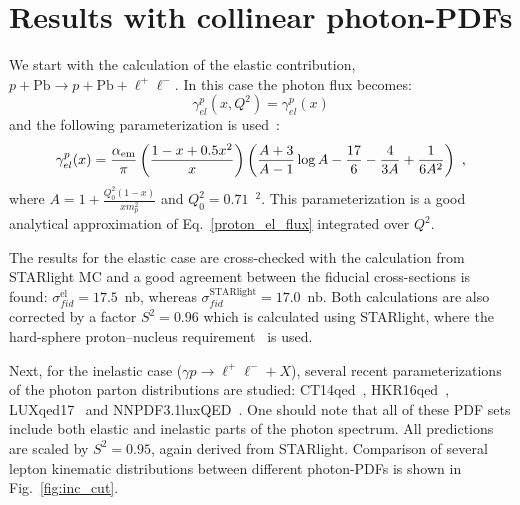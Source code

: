 \section{Results with collinear photon-PDFs}

We start with the calculation of the elastic contribution, $p+\textrm{Pb}\rightarrow p+\textrm{Pb}+ \ell^+\ell^-$.
In this case the photon flux becomes:
\begin{equation}
\gamma^{p}_{el}(x, Q^2) = \gamma^{p}_{el}(x) 
\end{equation}
and the following parameterization is used~\cite{Budnev:1974de}:
\begin{equation}
\gamma^{p}_{el}(x)  = \frac{\alpha_{\rm em}}{\pi}
\left(
\frac{1-x+0.5x^2}{x}
\right)
\left(
\frac{A+3}{A-1}\log{A}-\frac{17}{6}-\frac{4}{3A}+\frac{1}{6A^2}
\right)~,
\end{equation}
where $A = 1+\frac{Q_0^2(1-x)}{x m_p^2}$ and $Q_0^2 = 0.71$~\GeV$^2$. This parameterization is a good analytical approximation of Eq.~\ref{proton_el_flux} integrated over $Q^2$.

The results for the elastic case are cross-checked with the calculation from STARlight MC and a good agreement between the fiducial cross-sections is found:
$\sigma_{fid}^{\textrm{el}} = 17.5$~nb, whereas $\sigma_{fid}^{\textrm{STARlight}} = 17.0$~nb.
Both calculations are also corrected by a factor $S^2=0.96$ which 
is calculated using STARlight, where the hard-sphere proton--nucleus requirement~\cite{Klein:2016yzr} is used.

Next, for the inelastic case ($\gamma p\rightarrow \ell^+\ell^- + X$), several recent parameterizations of the photon parton distributions are studied: CT14qed~\cite{Schmidt:2015zda}, HKR16qed~\cite{Harland-Lang:2016kog}, LUXqed17~\cite{Manohar:2017eqh} and NNPDF3.1luxQED~\cite{Bertone:2017bme}. 
One should note that all of these PDF sets include both elastic and inelastic parts of the photon spectrum.
All predictions are scaled by $S^2=0.95$, again derived from STARlight.
Comparison of several lepton kinematic distributions between different photon-PDFs is shown in Fig.~\ref{fig:inc_cut}.

